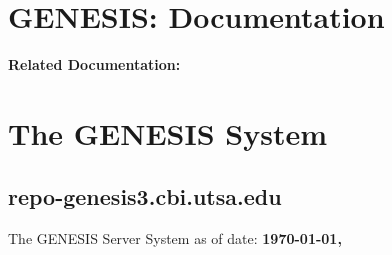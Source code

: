 \documentclass[12pt]{article}
\begin{document}
\section*{GENESIS: Documentation}

{\bf Related Documentation:}

\section*{The GENESIS System}

\subsection*{\bf repo-genesis3.cbi.utsa.edu}

The GENESIS Server System as of date: {\bf\today, \thistime}
\end{document}
